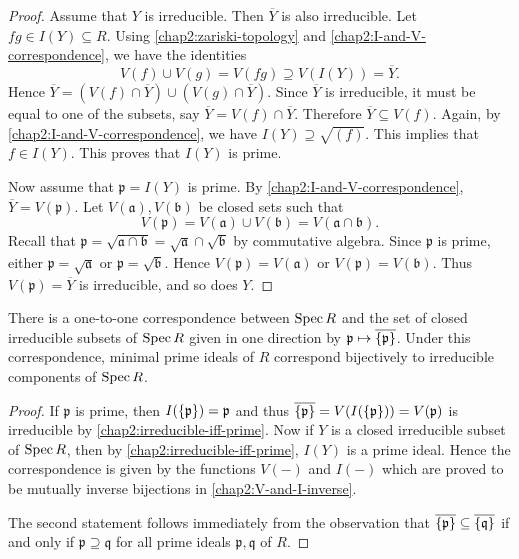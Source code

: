 \begin{proof}
	Assume that $Y$ is irreducible. Then $\overline{Y}$ is also irreducible. Let $fg \in I(Y) \subseteq R$. Using \cref{chap2:zariski-topology} and \cref{chap2:I-and-V-correspondence}, we have the identities
	\begin{equation*}
		V(f) \cup V(g) = V(fg) \supseteq V(I(Y)) = \overline{Y}.
	\end{equation*} 
	Hence $\overline{Y} = (V(f) \cap \overline{Y}) \cup (V(g) \cap \overline{Y})$. Since $\overline{Y}$ is irreducible, it must be equal to one of the subsets, say $\overline{Y} = V(f) \cap \overline{Y}$. Therefore $\overline{Y} \subseteq V(f)$. Again, by \cref{chap2:I-and-V-correspondence}, we have $I(Y) \supseteq \sqrt{(f)}$. This implies that $f \in I(Y)$. This proves that $I(Y)$ is prime.
	
	Now assume that $\mathfrak{p} = I(Y)$ is prime. By \cref{chap2:I-and-V-correspondence}, $\overline{Y} = V(\mathfrak{p})$. Let $V(\mathfrak{a}), V(\mathfrak{b})$ be closed sets such that
	\begin{equation*}
		V(\mathfrak{p}) = V(\mathfrak{a}) \cup V(\mathfrak{b}) = V(\mathfrak{a}\cap \mathfrak{b}).
	\end{equation*}
	Recall that  $\mathfrak{p} = \sqrt{\mathfrak{a} \cap \mathfrak{b}} = \sqrt{\mathfrak{a}} \cap \sqrt{\mathfrak{b}}$ by commutative algebra. Since $\mathfrak{p}$ is prime, either $\mathfrak{p} = \sqrt{\mathfrak{a}}$ or $\mathfrak{p} = \sqrt{\mathfrak{b}}$. Hence $V(\mathfrak{p}) = V(\mathfrak{a})$ or $V(\mathfrak{p}) = V(\mathfrak{b})$. Thus $V(\mathfrak{p}) = \overline{Y}$ is irreducible, and so does $Y$.
\end{proof}

\begin{proposition}\label{chap2:correspondence-closed-irreducible-minimal}
	There is a one-to-one correspondence between $\operatorname{Spec} R$ and the set of closed irreducible subsets of $\operatorname{Spec} R$ given in one direction by $\mathfrak{p} \mapsto \overline{\lbrace\mathfrak{p}\rbrace}$. Under this correspondence, minimal prime ideals of $R$ correspond bijectively to irreducible components of $\operatorname{Spec} R$.
\end{proposition}
\begin{proof}
	If $\mathfrak{p}$ is prime, then $I(\lbrace\mathfrak{p}\rbrace) = \mathfrak{p}$ and thus $\overline{\mathfrak{\lbrace p\rbrace}} = V(I(\lbrace\mathfrak{p}\rbrace)) = V(\mathfrak{p})$ is irreducible by \cref{chap2:irreducible-iff-prime}. Now if $Y$ is a closed irreducible subset of $\operatorname{Spec} R$, then by \cref{chap2:irreducible-iff-prime}, $I(Y)$ is a prime ideal. Hence the correspondence is given by the functions $V(-)$ and $I(-)$ which are proved to be mutually inverse bijections in \cref{chap2:V-and-I-inverse}. 
	
	The second statement follows immediately from the observation that $\overline{\lbrace\mathfrak{p}\rbrace} \subseteq \overline{\lbrace\mathfrak{q}\rbrace}$ if and only if $\mathfrak{p} \supseteq \mathfrak{q}$ for all prime ideals $\mathfrak{p}, \mathfrak{q}$ of $R$. 
\end{proof}

